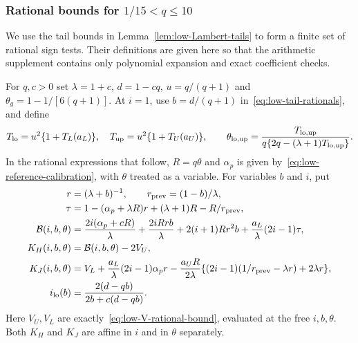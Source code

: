 \subsubsection{Rational bounds for \texorpdfstring{$1/15<q\le10$}{1/15 < q <= 10}}
We use the tail bounds in Lemma~\ref{lem:low-Lambert-tails} to
form a finite set of rational sign tests.  Their definitions are given
here so that the arithmetic supplement contains only polynomial
expansion and exact coefficient checks.

For $q,c>0$ set $\lambda=1+c$, $d=1-cq$, $u=q/(q+1)$ and
$\theta_g=1-1/[6(q+1)]$. At $i=1$, use
$b=d/(q+1)$ in~\eqref{eq:low-tail-rationals}, and define
\begin{equation}\label{eq:low-theta-enclosures}
 T_{\rm lo}=u^2\{1+T_L(a_L)\},\quad
 T_{\rm up}=u^2\{1+T_U(a_U)\},\qquad
 \theta_{\rm lo,up}=
 \frac{T_{\rm lo,up}}{q\{2q-(\lambda+1)T_{\rm lo,up}\}}.
\end{equation}
In the rational expressions that follow, $R=q\theta$ and
$\alpha_p$ is given by~\eqref{eq:low-reference-calibration}, with
$\theta$ treated as a variable. For variables $b$ and $i$, put
\begin{align}
 r&=(\lambda+b)^{-1},\qquad r_{\rm prev}=(1-b)/\lambda,\nonumber\\
 \tau&=1-(\alpha_p+\lambda R)r+(\lambda+1)R-R/r_{\rm prev},
 \nonumber\\
 \mathcal B(i,b,\theta)&=\frac{2i(\alpha_p+cR)}\lambda
       +\frac{2iRrb}\lambda+2(i+1)Rr^2b
                              +\frac{a_L}{\lambda}(2i-1)\tau,\nonumber\\
 K_H(i,b,\theta)&=\mathcal B(i,b,\theta)-2V_U,\nonumber\\
 K_J(i,b,\theta)&=V_L+\frac{a_L}{\lambda}(2i-1)\alpha_pr
 -\frac{a_U R}{2\lambda}
       \{(2i-1)(1/r_{\rm prev}-\lambda r)+2\lambda r\},
 \label{eq:low-age-rational-tests}\\
 i_{\rm lo}(b)&=\frac{2(d-qb)}{2b+c(d-qb)}.\nonumber
\end{align}
Here $V_U,V_L$ are exactly~\eqref{eq:low-V-rational-bound}, evaluated
at the free $i,b,\theta$.  Both $K_H$ and $K_J$ are affine in $i$
and in $\theta$ separately.

